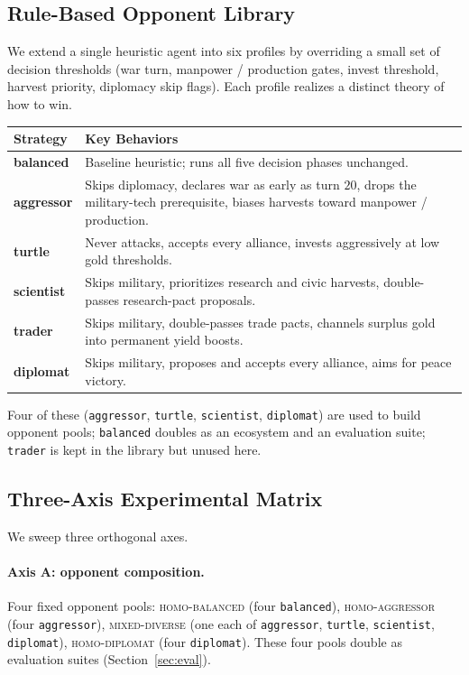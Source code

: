 \documentclass[11pt, a4paper, onecolumn]{article} %
\begin{document}
\subsection{Rule-Based Opponent Library}
\label{sec:opponents}

We extend a single heuristic agent into six profiles by overriding a small
set of decision thresholds (war turn, manpower / production gates, invest
threshold, harvest priority, diplomacy skip flags). Each profile realizes a
distinct theory of how to win.

\begin{center}
\small
\begin{tabular}{lp{11.5cm}}
\toprule
\textbf{Strategy} & \textbf{Key Behaviors} \\
\midrule
\textbf{balanced}   & Baseline heuristic; runs all five decision phases unchanged. \\
\textbf{aggressor}  & Skips diplomacy, declares war as early as turn $20$, drops the military-tech prerequisite, biases harvests toward manpower / production. \\
\textbf{turtle}     & Never attacks, accepts every alliance, invests aggressively at low gold thresholds. \\
\textbf{scientist}  & Skips military, prioritizes research and civic harvests, double-passes research-pact proposals. \\
\textbf{trader}     & Skips military, double-passes trade pacts, channels surplus gold into permanent yield boosts. \\
\textbf{diplomat}   & Skips military, proposes and accepts every alliance, aims for peace victory. \\
\bottomrule
\end{tabular}
\end{center}

Four of these (\texttt{aggressor}, \texttt{turtle}, \texttt{scientist},
\texttt{diplomat}) are used to build opponent pools; \texttt{balanced}
doubles as an ecosystem and an evaluation suite; \texttt{trader} is kept
in the library but unused here.

\subsection{Three-Axis Experimental Matrix}
\label{sec:matrix}

We sweep three orthogonal axes.

\paragraph{Axis A: opponent composition.}
Four fixed opponent pools:
\textsc{homo-balanced} (four \texttt{balanced}),
\textsc{homo-aggressor} (four \texttt{aggressor}),
\textsc{mixed-diverse} (one each of
\texttt{aggressor}, \texttt{turtle}, \texttt{scientist}, \texttt{diplomat}),
\textsc{homo-diplomat} (four \texttt{diplomat}). These four pools double as
evaluation suites (Section~\ref{sec:eval}).
\end{document}
